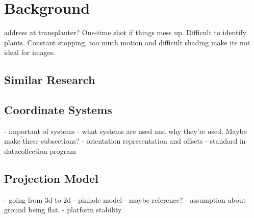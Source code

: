 
\cleardoublepage

\chapter{Background}
\label{background}

address at transplanter?  One-time shot if things mess up.  Difficult to identify plants.  Constant stopping, too much motion and difficult shading make its not ideal for images. 

\section{Similar Research}


\section{Coordinate Systems}

  - important of systems
  - what systems are used and why they're used. Maybe make these subsections?
  - orientation representation and offsets - standard in datacollection program

\section{Projection Model}
 
 - going from 3d to 2d
 - pinhole model - maybe reference?
 - assumption about ground being flat. 
 - platform stability
